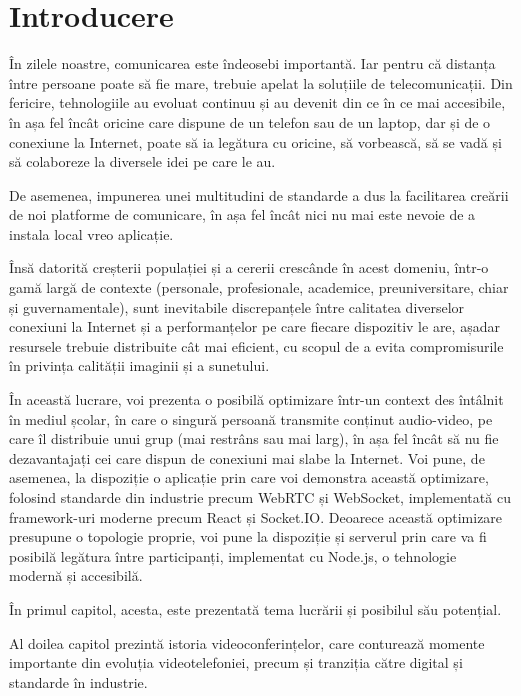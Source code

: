 \chapter{Introducere}
\label{intro}
\indent \par În zilele noastre, comunicarea este îndeosebi importantă. Iar pentru că distanța între persoane poate să fie mare, trebuie apelat la soluțiile de telecomunicații. Din fericire, tehnologiile au evoluat continuu și au devenit din ce în ce mai accesibile, în așa fel încât oricine care dispune de un telefon sau de un laptop, dar și de o conexiune la Internet, poate să ia legătura cu oricine, să vorbească, să se vadă și să colaboreze la diversele idei pe care le au. 
\indent \par De asemenea, impunerea unei multitudini de standarde a dus la facilitarea creării de noi platforme de comunicare, în așa fel încât nici nu mai este nevoie de a instala local vreo aplicație.
\indent \par Însă datorită creșterii populației și a cererii crescânde în acest domeniu, într-o gamă largă de contexte (personale, profesionale, academice, preuniversitare, chiar și guvernamentale), sunt inevitabile discrepanțele între calitatea diverselor conexiuni la Internet și a performanțelor pe care fiecare dispozitiv le are, așadar resursele trebuie distribuite cât mai eficient, cu scopul de a evita compromisurile în privința calității imaginii și a sunetului.
\indent \par În această lucrare, voi prezenta o posibilă optimizare într-un context des întâlnit în mediul școlar, în care o singură persoană transmite conținut audio-video, pe care îl distribuie unui grup (mai restrâns sau mai larg), în așa fel încât să nu fie dezavantajați cei care dispun de conexiuni mai slabe la Internet. Voi pune, de asemenea, la dispoziție o aplicație prin care voi demonstra această optimizare, folosind standarde din industrie precum WebRTC și WebSocket, implementată cu framework-uri moderne precum React și Socket.IO. Deoarece această optimizare presupune o topologie proprie, voi pune la dispoziție și serverul prin care va fi posibilă legătura între participanți, implementat cu Node.js, o tehnologie modernă și accesibilă.
\indent \par În primul capitol, acesta, este prezentată tema lucrării și posibilul său potențial.
\indent \par Al doilea capitol prezintă istoria videoconferințelor, care conturează momente importante din evoluția videotelefoniei, precum și tranziția către digital și standarde în industrie.
